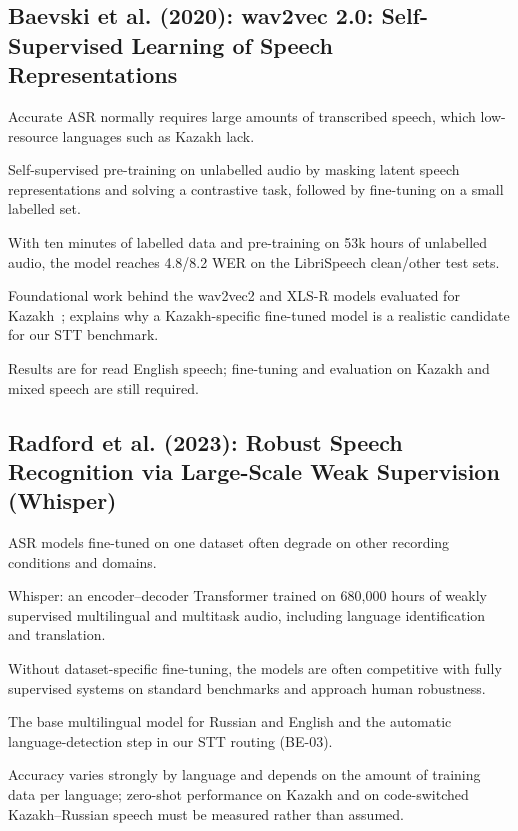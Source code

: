 \documentclass[11pt,a4paper]{article}
\newenvironment{sourceinfo}{\begin{description}[leftmargin=0pt,labelsep=0.5em,font=\normalfont\bfseries]}{\end{description}}
\newcommand{\source}[2]{\subsection{\texorpdfstring{#1~\cite{#2}}{#1}}}
\begin{document}
\source{Baevski et al. (2020): wav2vec 2.0: Self-Supervised Learning of Speech Representations}{baevski2020wav2vec}
\begin{sourceinfo}
  \item[Problem.] Accurate ASR normally requires large amounts of transcribed speech, which low-resource languages such as Kazakh lack.
  \item[Method.] Self-supervised pre-training on unlabelled audio by masking latent speech representations and solving a contrastive task, followed by fine-tuning on a small labelled set.
  \item[Reported findings.] With ten minutes of labelled data and pre-training on 53k hours of unlabelled audio, the model reaches 4.8/8.2 WER on the LibriSpeech clean/other test sets.
  \item[Relevance.] Foundational work behind the wav2vec2 and XLS-R models evaluated for Kazakh~\cite{kozhirbayev2023kazakh}; explains why a Kazakh-specific fine-tuned model is a realistic candidate for our STT benchmark.
  \item[Limitation.] Results are for read English speech; fine-tuning and evaluation on Kazakh and mixed speech are still required.
\end{sourceinfo}

\source{Radford et al. (2023): Robust Speech Recognition via Large-Scale Weak Supervision (Whisper)}{radford2023whisper}
\begin{sourceinfo}
  \item[Problem.] ASR models fine-tuned on one dataset often degrade on other recording conditions and domains.
  \item[Method.] Whisper: an encoder--decoder Transformer trained on 680{,}000 hours of weakly supervised multilingual and multitask audio, including language identification and translation.
  \item[Reported findings.] Without dataset-specific fine-tuning, the models are often competitive with fully supervised systems on standard benchmarks and approach human robustness.
  \item[Relevance.] The base multilingual model for Russian and English and the automatic language-detection step in our STT routing (BE-03).
  \item[Limitation.] Accuracy varies strongly by language and depends on the amount of training data per language; zero-shot performance on Kazakh and on code-switched Kazakh--Russian speech must be measured rather than assumed.
\end{sourceinfo}
\end{document}
